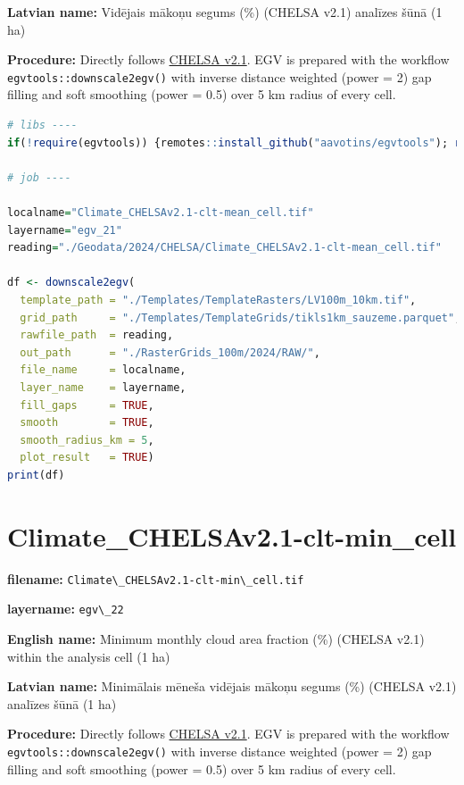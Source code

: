 \documentclass[
]{book}
\newcommand{\passthrough}[1]{#1}
\begin{document}
\textbf{Latvian name:} Vidējais mākoņu segums (\%) (CHELSA v2.1) analīzes šūnā (1 ha)

\textbf{Procedure:} Directly follows \hyperref[Ch04.11]{CHELSA v2.1}. EGV is prepared with the
workflow \passthrough{\lstinline!egvtools::downscale2egv()!} with inverse distance weighted (power = 2)
gap filling and soft smoothing (power = 0.5) over 5 km radius of every cell.

\begin{lstlisting}[language=R]
# libs ----
if(!require(egvtools)) {remotes::install_github("aavotins/egvtools"); require(egvtools)}

# job ----

localname="Climate_CHELSAv2.1-clt-mean_cell.tif"
layername="egv_21"
reading="./Geodata/2024/CHELSA/Climate_CHELSAv2.1-clt-mean_cell.tif"

df <- downscale2egv(
  template_path = "./Templates/TemplateRasters/LV100m_10km.tif",
  grid_path     = "./Templates/TemplateGrids/tikls1km_sauzeme.parquet",
  rawfile_path  = reading,
  out_path      = "./RasterGrids_100m/2024/RAW/",
  file_name     = localname,
  layer_name    = layername,
  fill_gaps     = TRUE,
  smooth        = TRUE,
  smooth_radius_km = 5,
  plot_result   = TRUE)
print(df)
\end{lstlisting}

\section{Climate\_CHELSAv2.1-clt-min\_cell}\label{ch06.022}

\textbf{filename:} \passthrough{\lstinline!Climate\_CHELSAv2.1-clt-min\_cell.tif!}

\textbf{layername:} \passthrough{\lstinline!egv\_22!}

\textbf{English name:} Minimum monthly cloud area fraction (\%) (CHELSA v2.1) within the analysis cell (1 ha)

\textbf{Latvian name:} Minimālais mēneša vidējais mākoņu segums (\%) (CHELSA v2.1) analīzes šūnā (1 ha)

\textbf{Procedure:} Directly follows \hyperref[Ch04.11]{CHELSA v2.1}. EGV is prepared with the
workflow \passthrough{\lstinline!egvtools::downscale2egv()!} with inverse distance weighted (power = 2)
gap filling and soft smoothing (power = 0.5) over 5 km radius of every cell.
\end{document}
